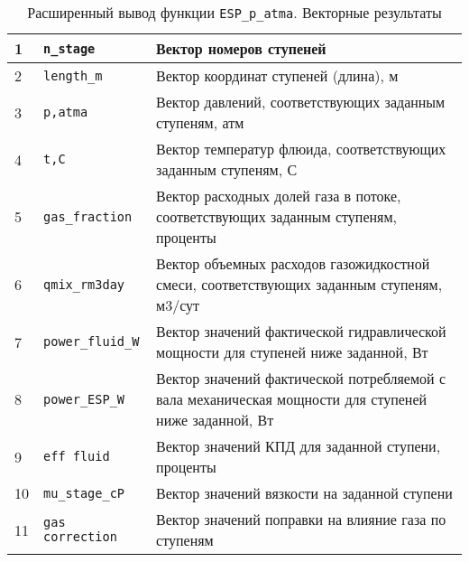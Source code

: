 \begin{table}[H]
	\caption{Расширенный вывод функции \texttt{ESP_p_atma}. Векторные результаты}
	\label{table:res_list_ESP_p_atma}
	\begin{tabular}{p{}p{}p{}}
		1 & \texttt{n_stage} & Вектор номеров ступеней   \\ \hline
		
		2 & \texttt{length_m} & Вектор координат ступеней (длина), м   \\ \hline
		3 & \texttt{p,atma} & Вектор давлений, соответствующих заданным ступеням, атм\\ \hline
		4 & \texttt{t,C} & Вектор температур флюида, соответствующих заданным ступеням, С   \\ \hline
		5 & \texttt{gas_fraction} & Вектор расходных долей газа в потоке, соответствующих заданным ступеням, проценты  \\ \hline
		6 & \texttt{qmix_rm3day} & Вектор объемных расходов газожидкостной смеси, соответствующих заданным ступеням, м3/сут   \\ \hline
		7 & \texttt{power_fluid_W} & Вектор значений фактической гидравлической мощности для ступеней ниже заданной, Вт \\ \hline
		8 & \texttt{power_ESP_W} & Вектор значений фактической потребляемой с вала механическая мощности для ступеней ниже заданной, Вт  \\ \hline
		
		9 & \texttt{eff fluid} & Вектор значений КПД для заданной ступени, проценты  \\ \hline
		
		
		10 & \texttt{mu_stage_cP} & Вектор значений вязкости на заданной ступени  \\ \hline
		11 & \texttt{gas correction} & Вектор значений поправки на влияние газа по ступеням \\ \hline
		
	\end{tabular}
\end{table}


